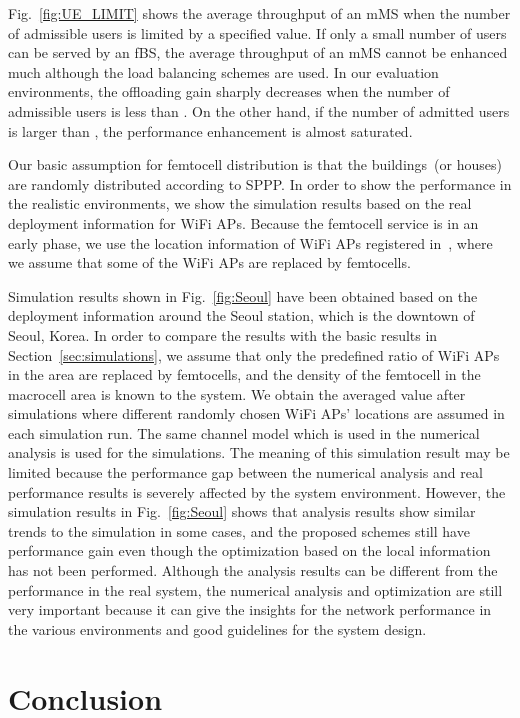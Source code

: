 \documentclass[journal]{IEEEtran}
\begin{document}
Fig.~\ref{fig:UE_LIMIT} shows the average throughput of an mMS
when the number of admissible users is limited by a specified value.
If only a small number of users can be served by an fBS,
the average throughput of an mMS cannot be enhanced much although
the load balancing schemes are used.
In our evaluation environments,
the offloading gain sharply decreases when the number of admissible users is less than .
On the other hand, if the number of admitted users is larger than , the performance
enhancement is almost saturated.

\label{sec:building}
Our basic assumption for femtocell distribution
is that the buildings~(or houses) are
randomly distributed according to SPPP.
In order to show the performance in
the realistic environments,
we show the simulation results based on the real
deployment information for WiFi APs.
Because the femtocell service is in an early phase,
we use the location information of WiFi APs registered
in~\cite{wigle}, where we assume
that some of the WiFi APs are replaced by femtocells.

Simulation results shown in Fig.~\ref{fig:Seoul} have been obtained
based on the deployment information around the Seoul station, which
is the downtown of Seoul, Korea. In order to compare the results with
the basic results in Section~\ref{sec:simulations}, we assume that only the predefined ratio
of WiFi APs in the area are replaced by femtocells, and the density of the femtocell in
the macrocell area is known to the system. We obtain the averaged value after
 simulations where different randomly chosen WiFi APs' locations
are assumed in each simulation run. The  same channel model
which is used in the numerical analysis is used for the simulations.
The meaning of this simulation result may be limited because the performance
gap between the numerical analysis and
real performance results is severely affected by the system environment.
However, the simulation results in Fig.~\ref{fig:Seoul}
shows that analysis results show similar trends to the simulation in some cases,
and the proposed schemes still have performance gain even though the
optimization based on the local information has not been performed.
Although the analysis results can be different from the performance in the real system,
the numerical analysis and optimization are still very important because it can give
the insights for the network performance in the various environments and good guidelines for the
system design.


\section{Conclusion}
\label{sec:conclusion}
\end{document}

